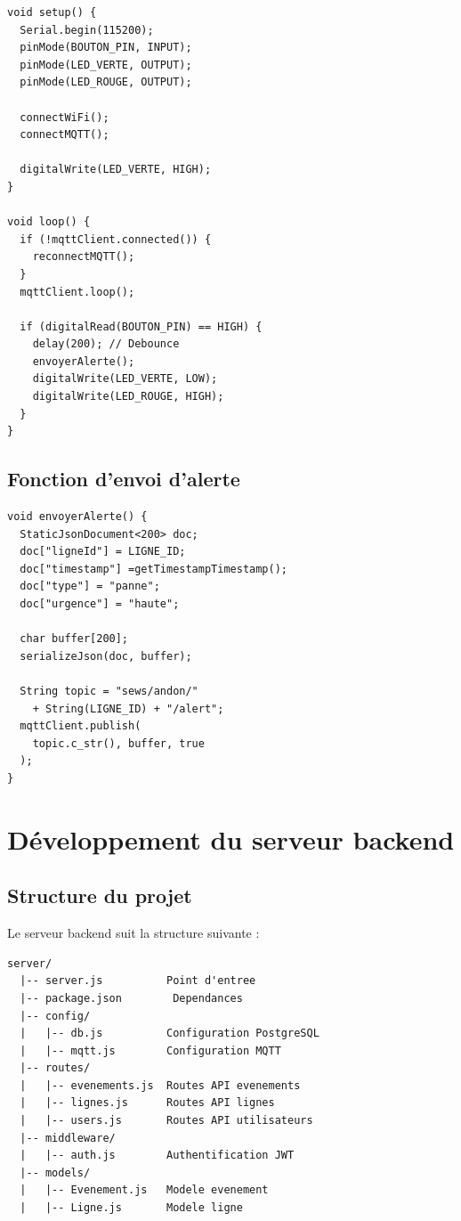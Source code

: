 \begin{lstlisting}[caption={Boucle principale du firmware ESP32},
label={lst:firmware_main}]
void setup() {
  Serial.begin(115200);
  pinMode(BOUTON_PIN, INPUT);
  pinMode(LED_VERTE, OUTPUT);
  pinMode(LED_ROUGE, OUTPUT);
  
  connectWiFi();
  connectMQTT();
  
  digitalWrite(LED_VERTE, HIGH);
}

void loop() {
  if (!mqttClient.connected()) {
    reconnectMQTT();
  }
  mqttClient.loop();
  
  if (digitalRead(BOUTON_PIN) == HIGH) {
    delay(200); // Debounce
    envoyerAlerte();
    digitalWrite(LED_VERTE, LOW);
    digitalWrite(LED_ROUGE, HIGH);
  }
}
\end{lstlisting}

\subsection{Fonction d'envoi d'alerte}

\begin{lstlisting}[caption={Envoi d'une alerte Andon via MQTT},
label={lst:envoyer_alerte}]
void envoyerAlerte() {
  StaticJsonDocument<200> doc;
  doc["ligneId"] = LIGNE_ID;
  doc["timestamp"] =getTimestampTimestamp();
  doc["type"] = "panne";
  doc["urgence"] = "haute";
  
  char buffer[200];
  serializeJson(doc, buffer);
  
  String topic = "sews/andon/" 
    + String(LIGNE_ID) + "/alert";
  mqttClient.publish(
    topic.c_str(), buffer, true
  );
}
\end{lstlisting}

\section{D\'eveloppement du serveur backend}

\subsection{Structure du projet}

Le serveur backend suit la structure suivante :

\begin{lstlisting}[caption={Arborescence du serveur backend},
label={lst:server_structure}]
server/
  |-- server.js          Point d'entree
  |-- package.json        Dependances
  |-- config/
  |   |-- db.js          Configuration PostgreSQL
  |   |-- mqtt.js        Configuration MQTT
  |-- routes/
  |   |-- evenements.js  Routes API evenements
  |   |-- lignes.js      Routes API lignes
  |   |-- users.js       Routes API utilisateurs
  |-- middleware/
  |   |-- auth.js        Authentification JWT
  |-- models/
  |   |-- Evenement.js   Modele evenement
  |   |-- Ligne.js       Modele ligne
\end{lstlisting}

